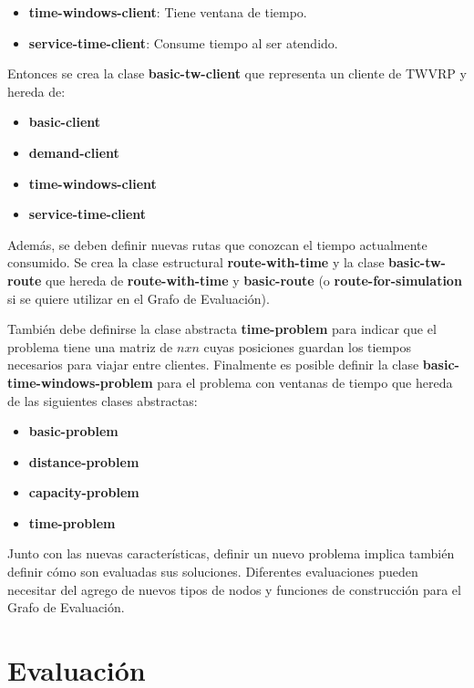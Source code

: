 \begin{itemize}
	\item \textbf{time-windows-client}: Tiene ventana de tiempo.
	\item \textbf{service-time-client}: Consume tiempo al ser atendido. 
\end{itemize}

Entonces se crea la clase \textbf{basic-tw-client} que representa un cliente de TWVRP y hereda de:

\begin{itemize}
	\item \textbf{basic-client}
	\item \textbf{demand-client}
	\item \textbf{time-windows-client}
	\item \textbf{service-time-client}
\end{itemize}

Además, se deben definir nuevas rutas que conozcan el tiempo actualmente consumido. Se crea la clase estructural \textbf{route-with-time} y la clase \textbf{basic-tw-route} que hereda de \textbf{route-with-time} y \textbf{basic-route} (o \textbf{route-for-simulation} si se quiere utilizar en el Grafo de Evaluación).

También debe definirse la clase abstracta \textbf{time-problem} para indicar que el problema tiene una matriz de $nxn$ cuyas posiciones guardan los tiempos necesarios para viajar entre clientes. Finalmente es posible definir la clase \textbf{basic-time-windows-problem} para el problema con ventanas de tiempo que hereda de las siguientes clases abstractas:

\begin{itemize}
	\item \textbf{basic-problem}
	\item \textbf{distance-problem}
	\item \textbf{capacity-problem}
	\item \textbf{time-problem}
\end{itemize}

Junto con las nuevas características, definir un nuevo problema implica también definir cómo son evaluadas sus soluciones. Diferentes evaluaciones pueden necesitar del agrego de nuevos tipos de nodos y funciones de construcción para el Grafo de Evaluación.

\section{Evaluación}\label{4-eval}

